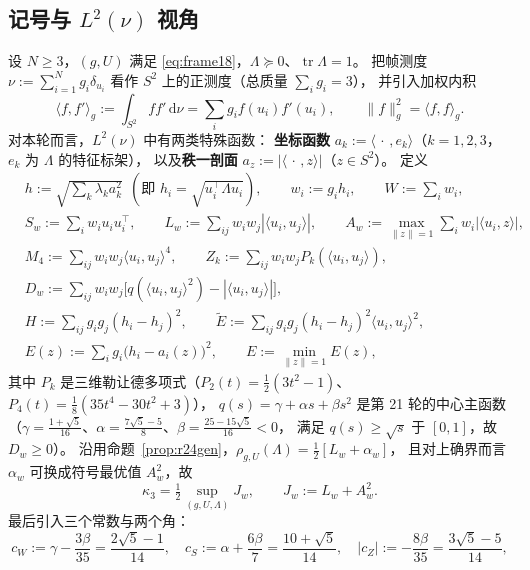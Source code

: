 \documentclass[UTF8,11pt]{ctexart}
\theoremstyle{definition}
\newcommand{\Lam}{\Lambda}
\newcommand{\tr}{\operatorname{tr}}
\newcommand{\dd}{\,\mathrm{d}}
\begin{document}
\subsection{记号与 $L^2(\nu)$ 视角}\label{sec:r25:not}

设 $N\ge3$，$(g,U)$ 满足 \eqref{eq:frame18}，$\Lam\succeq0$、$\tr\Lam=1$。
把帧测度 $\nu:=\sum_{i=1}^Ng_i\delta_{u_i}$ 看作 $S^2$ 上的正测度（总质量 $\sum_ig_i=3$），
并引入加权内积
\[
\langle f,f'\rangle_g:=\int_{S^2}ff'\dd\nu=\sum_ig_if(u_i)f'(u_i),
\qquad \|f\|_g^2=\langle f,f\rangle_g .
\]
对本轮而言，$L^2(\nu)$ 中有两类特殊函数：
\textbf{坐标函数} $a_k:=\langle\,\cdot\,,e_k\rangle$（$k=1,2,3$，$e_k$ 为 $\Lam$ 的特征标架），
以及\textbf{秩一剖面} $a_z:=|\langle\,\cdot\,,z\rangle|$（$z\in S^2$）。
定义
\begin{equation}\label{eq:r25def}
\begin{aligned}
&h:=\sqrt{\textstyle\sum_k\lambda_ka_k^2}\ \ (\text{即 }h_i=\sqrt{u_i^\top\Lam u_i}),\qquad
w_i:=g_ih_i,\qquad W:=\sum_iw_i,\\
&S_w:=\sum_iw_iu_iu_i^\top,\qquad
L_w:=\sum_{ij}w_iw_j|\langle u_i,u_j\rangle|,\qquad
A_w:=\max_{\|z\|=1}\sum_iw_i|\langle u_i,z\rangle|,\\
&M_4:=\sum_{ij}w_iw_j\langle u_i,u_j\rangle^4,\qquad
Z_k:=\sum_{ij}w_iw_jP_k(\langle u_i,u_j\rangle),\\
&D_w:=\sum_{ij}w_iw_j\bigl[q(\langle u_i,u_j\rangle^2)-|\langle u_i,u_j\rangle|\bigr],\\
&H:=\sum_{ij}g_ig_j(h_i-h_j)^2,\qquad
\widetilde E:=\sum_{ij}g_ig_j(h_i-h_j)^2\langle u_i,u_j\rangle^2,\\
&E(z):=\sum_ig_i\bigl(h_i-a_i(z)\bigr)^2,\qquad E:=\min_{\|z\|=1}E(z),
\end{aligned}
\end{equation}
其中 $P_k$ 是三维勒让德多项式（$P_2(t)=\frac12(3t^2-1)$、$P_4(t)=\frac18(35t^4-30t^2+3)$），
$q(s)=\gamma+\alpha s+\beta s^2$ 是第 21 轮的中心主函数
（$\gamma=\frac{1+\sqrt5}{16}$、$\alpha=\frac{7\sqrt5-5}8$、$\beta=\frac{25-15\sqrt5}{16}<0$，
满足 $q(s)\ge\sqrt s$ 于 $[0,1]$，故 $D_w\ge0$）。
沿用命题~\ref{prop:r24gen}，$\rho_{g,U}(\Lam)=\frac12[L_w+\alpha_w]$，
且对上确界而言 $\alpha_w$ 可换成符号最优值 $A_w^2$，故
\begin{equation}\label{eq:r25Jw}
\kappa_3=\tfrac12\sup_{(g,U,\Lam)}J_w,\qquad J_w:=L_w+A_w^2 .
\end{equation}
最后引入三个常数与两个角：
\begin{equation}\label{eq:r25const}
c_W:=\gamma-\frac{3\beta}{35}=\frac{2\sqrt5-1}{14},\quad
c_S:=\alpha+\frac{6\beta}7=\frac{10+\sqrt5}{14},\quad
|c_Z|:=-\frac{8\beta}{35}=\frac{3\sqrt5-5}{14},
\end{equation}
\end{document}
